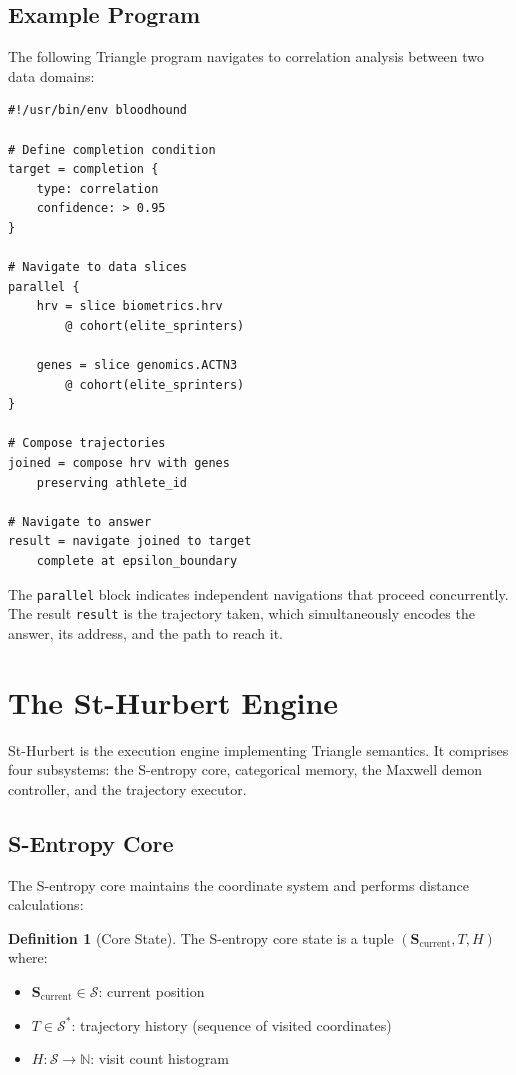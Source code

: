 \documentclass[10pt,twocolumn]{article}
\theoremstyle{definition}
\newtheorem{definition}[theorem]{Definition}
\theoremstyle{remark}
\newcommand{\Scoord}{\mathbf{S}}
\newcommand{\Sspace}{\mathcal{S}}
\begin{document}
\subsection{Example Program}

The following Triangle program navigates to correlation analysis between two data domains:

\begin{lstlisting}
#!/usr/bin/env bloodhound

# Define completion condition
target = completion {
    type: correlation
    confidence: > 0.95
}

# Navigate to data slices
parallel {
    hrv = slice biometrics.hrv
        @ cohort(elite_sprinters)

    genes = slice genomics.ACTN3
        @ cohort(elite_sprinters)
}

# Compose trajectories
joined = compose hrv with genes
    preserving athlete_id

# Navigate to answer
result = navigate joined to target
    complete at epsilon_boundary
\end{lstlisting}

The \texttt{parallel} block indicates independent navigations that proceed concurrently. The result \texttt{result} is the trajectory taken, which simultaneously encodes the answer, its address, and the path to reach it.

\section{The St-Hurbert Engine}
\label{sec:engine}

St-Hurbert is the execution engine implementing Triangle semantics. It comprises four subsystems: the S-entropy core, categorical memory, the Maxwell demon controller, and the trajectory executor.

\subsection{S-Entropy Core}

The S-entropy core maintains the coordinate system and performs distance calculations:

\begin{definition}[Core State]
The S-entropy core state is a tuple $(\Scoord_{\text{current}}, T, H)$ where:
\begin{itemize}[nosep]
\item $\Scoord_{\text{current}} \in \Sspace$: current position
\item $T \in \Sspace^*$: trajectory history (sequence of visited coordinates)
\item $H : \Sspace \to \mathbb{N}$: visit count histogram
\end{itemize}
\end{definition}
\end{document}
